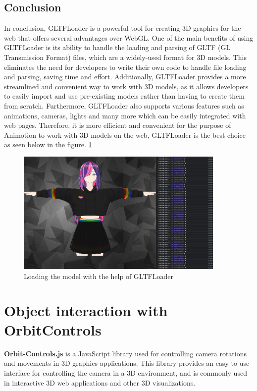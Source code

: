 \subsection{Conclusion}
In conclusion, GLTFLoader is a powerful tool for creating 3D graphics for the web that 
offers several advantages over WebGL. One of the main benefits of using GLTFLoader is 
its ability to handle the loading and parsing of GLTF (GL Transmission Format) files, 
which are a widely-used format for 3D models. This eliminates the need for developers 
to write their own code to handle file loading and parsing, saving time and effort. 
Additionally, GLTFLoader provides a more streamlined and convenient way to work with 
3D models, as it allows developers to easily import and use pre-existing models rather 
than having to create them from scratch. Furthermore, GLTFLoader also supports various 
features such as animations, cameras, lights and many more which can be easily integrated 
with web pages. Therefore, it is more efficient and convenient for the purpose of Animotion 
to work with 3D models on the web, GLTFLoader is the best choice as seen below in the figure. \ref{fig:gltfloader}
\\
\begin{figure}[htb]
    \centering
    \includegraphics[width=0.9\textwidth]{pics/GLTFLoader.png}
    \caption{Loading the model with the help of GLTFLoader}
    \label{fig:gltfloader}
\end{figure}
\newpage
\section{Object interaction with OrbitControls}
\author{Romeo Bhuiyan}
\textbf{Orbit-Controls.js} is a JavaScript library used for controlling camera rotations 
and movements in 3D graphics applications. This library provides an easy-to-use 
interface for controlling the camera in a 3D environment, and is commonly used in 
interactive 3D web applications and other 3D visualizations.

